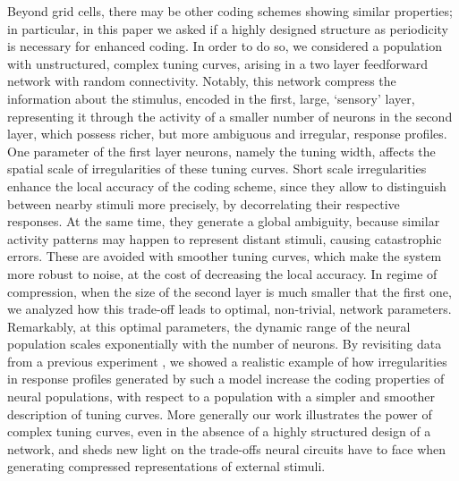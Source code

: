 \documentclass[a4paper]{article}
\begin{document}
Beyond grid cells, there may be other coding schemes showing similar properties; in particular, in this paper we asked if a highly designed structure as periodicity is necessary for enhanced coding. In order to do so, we considered a population with unstructured, complex tuning curves, arising in a two layer  feedforward network with random connectivity.  Notably, this network compress the information about the stimulus, encoded in the first, large, `sensory' layer, representing it through the activity of a smaller number of neurons in the second layer, which possess richer, but more ambiguous and irregular, response profiles. 
One parameter of the first layer neurons, namely the tuning width, affects the spatial scale of irregularities of these tuning curves. Short scale irregularities enhance the local accuracy of the coding scheme, since they allow to distinguish between nearby stimuli more precisely, by decorrelating their respective responses. At the same time, they generate a global ambiguity, because similar activity patterns may happen to represent distant stimuli, causing catastrophic errors. These are avoided with smoother tuning curves, which make the system more robust to noise, at the cost of decreasing the local accuracy. In  regime of compression, when the size of the second layer is much smaller that the first one, we analyzed how this trade-off leads to optimal, non-trivial, network parameters. Remarkably, at this optimal parameters, the dynamic range of the neural population scales exponentially with the number of neurons.
By revisiting data from a previous experiment \cite[]{Lalazar2016TuningConnectivity}, we showed a realistic example of how irregularities in response profiles generated by such a model increase the coding properties of neural populations, with respect to a population with a simpler and smoother description of tuning curves. More generally our work illustrates the power of complex tuning curves, even in the absence of a highly structured design of a network, and sheds new light on the trade-offs neural circuits have to face when generating compressed representations of external stimuli.
\end{document}
